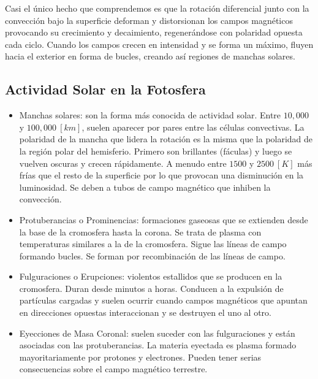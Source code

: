 \documentclass{tufte-handout}
\begin{document}

Casi el único hecho que comprendemos es que la rotación diferencial junto con la convección bajo la superficie deforman y distorsionan los campos magnéticos provocando su crecimiento y decaimiento, regenerándose con polaridad opuesta cada ciclo. Cuando los campos crecen en intensidad y se forma un máximo, fluyen hacia el exterior en forma de bucles, creando así regiones de manchas solares.

\subsection{Actividad Solar en la Fotosfera}

\begin{itemize}
  \item Manchas solares: son la forma más conocida de actividad solar. Entre $10,000$ y $100,000~[km]$, suelen aparecer por pares entre las células convectivas. La polaridad de la mancha que lidera la rotación es la misma que la polaridad de la región polar del hemisferio. Primero son brillantes (fáculas) y luego se vuelven oscuras y crecen rápidamente. A menudo entre $1500$ y $2500~[K]$ más frías que el resto de la superficie por lo que provocan una disminución en la luminosidad. Se deben a tubos de campo magnético que inhiben la convección.

  \item Protuberancias o Prominencias: formaciones gaseosas que se extienden desde la base de la cromosfera hasta la corona. Se trata de plasma con temperaturas similares a la de la cromosfera. Sigue las líneas de campo formando bucles. Se forman por recombinación de las líneas de campo.

  \item Fulguraciones o Erupciones: violentos estallidos que se producen en la cromosfera. Duran desde minutos a horas. Conducen a la expulsión de partículas cargadas y suelen ocurrir cuando campos magnéticos que apuntan en direcciones opuestas interaccionan y se destruyen el uno al otro.
  
  \item Eyecciones de Masa Coronal: suelen suceder con las fulguraciones y están asociadas con las protuberancias. La materia eyectada es plasma formado mayoritariamente por protones y electrones. Pueden tener serias consecuencias sobre el campo magnético terrestre.
\end{itemize}
\end{document}
